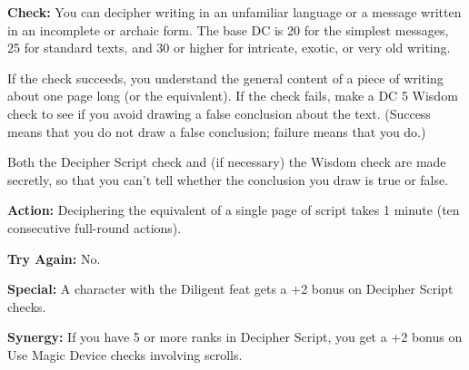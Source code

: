 \textbf{Check:} You can decipher writing in an unfamiliar language or a message written in an incomplete or archaic form. The base DC is 20 for the simplest messages, 25 for standard texts, and 30 or higher for intricate, exotic, or very old writing.

If the check succeeds, you understand the general content of a piece of writing about one page long (or the equivalent). If the check fails, make a DC 5 Wisdom check to see if you avoid drawing a false conclusion about the text. (Success means that you do not draw a false conclusion; failure means that you do.)

Both the Decipher Script check and (if necessary) the Wisdom check are made secretly, so that you can’t tell whether the conclusion you draw is true or false.

\textbf{Action:} Deciphering the equivalent of a single page of script takes 1 minute (ten consecutive full-round actions).

\textbf{Try Again:} No.

\textbf{Special:} A character with the Diligent feat gets a +2 bonus on Decipher Script checks.

\textbf{Synergy:} If you have 5 or more ranks in Decipher Script, you get a +2 bonus on Use Magic Device checks involving scrolls.